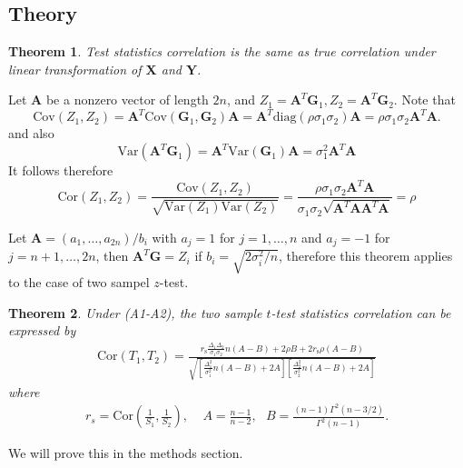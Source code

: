 \documentclass[11pt, a4paper]{article}
\newtheorem{theorem}{Theorem}       %
\begin{document}
\subsection{Theory}
\begin{theorem} 
 Test statistics correlation is the same as true correlation under linear transformation of $\bm X$ and $\bm Y$.
\end{theorem}
	Let $\bm A$ be a nonzero vector of length $2n$, and $Z_1 =\bm A^T\bm G_1, Z_2 = \bm A^T\bm G_2$. 
	Note that \[
	\text{Cov}(Z_1, Z_2) = \bm A^T\text{Cov}(\bm G_1, \bm G_2)\bm A = \bm A^T\text{diag}(\rho\sigma_1\sigma_2)\bm A =\rho\sigma_1\sigma_2\bm A^T\bm A.\]
	and also
	\[\text{Var}(\bm A^T\bm G_1) = \bm A^T\text{Var}(\bm G_1)\bm A = \sigma_1^2\bm A^T\bm A\]
	It follows therefore 
	\[\text{Cor}(Z_1, Z_2) = \frac{\text{Cov}(Z_1, Z_2) }{\sqrt{\text{Var}(Z_1)\text{Var}(Z_2)}} = \frac{\rho\sigma_1\sigma_2\bm A^T\bm A}{\sigma_1\sigma_2 \sqrt{\bm A^T\bm A\bm A^T\bm A}}=\rho\]
	
Let $\bm A = (a_1, \ldots, a_{2n}) /b_i$ with $a_j = 1$ for $j = 1, \ldots, n$ and $a_j = -1$ for $j =n+1, \ldots, 2n$, then $\bm A^T \bm G = Z_i$ if $b_i = \sqrt{2\sigma_i^2 /n}$, therefore this theorem applies to the case of two sampel $z$-test.

\begin{theorem}\label{theoremTstat} 
	Under (A1-A2),  the two sample $t$-test statistics correlation can be expressed by 
	\begin{align}\label{tTestCorrelation}
	\text{Cor}(T_1, T_2)  = \frac{r_{\text{s}}\frac{\Delta_1\Delta_2}{\sigma_1\sigma_2}n(A-B) + 2\rho B + 2r_{\text{s}}\rho(A-B)}{\sqrt{\left[ \frac{\Delta_1^2}{\sigma_1^2}n(A-B) + 2 A\right]\left[\frac{\Delta_2^2}{\sigma_2^2}n(A-B) + 2 A\right]}}
	\end{align} where 
	\begin{align}\label{invScor}
	r_s = \text{Cor}(\frac{1}{S_1}, \frac{1}{S_2}), ~~~~~A = \frac{n-1}{n-2}, ~~~B = \frac{(n-1)\Gamma^2(n-3/2)}{\Gamma^2(n-1)}.
	\end{align}
\end{theorem}
We will prove this in the methods section.
\end{document}
